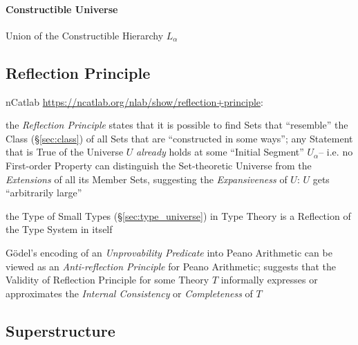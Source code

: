 \paragraph{Constructible Universe}\label{sec:constructible_universe}\hfill

Union of the Constructible Hierarchy $L_\alpha$



\subsection{Reflection Principle}\label{sec:reflection_principle}

nCatlab \url{https://ncatlab.org/nlab/show/reflection+principle}:

the \emph{Reflection Principle} states that it is possible to find
Sets that ``resemble'' the Class (\S\ref{sec:class}) of all Sets that
are ``constructed in some ways''; any Statement that is True of the
Universe $U$ \emph{already} holds at some ``Initial Segment''
$U_\alpha$-- i.e. no First-order Property can distinguish the
Set-theoretic Universe from the \emph{Extensions} of all its Member
Sets, suggesting the \emph{Expansiveness} of $U$: $U$ gets
``arbitrarily large''


the Type of Small Types (\S\ref{sec:type_universe}) in Type Theory is
a Reflection of the Type System in itself

G\"odel's encoding of an \emph{Unprovability Predicate} into Peano
Arithmetic can be viewed as an \emph{Anti-reflection Principle} for
Peano Arithmetic; suggests that the Validity of Reflection Principle
for some Theory $T$ informally expresses or approximates the
\emph{Internal Consistency} or \emph{Completeness} of $T$



\subsection{Superstructure}\label{sec:superstructure}

